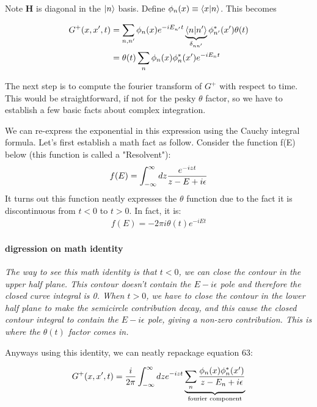 \documentclass[11pt]{article}
\theoremstyle{definition}
\begin{document}
Note $\mathbf{H}$ is diagonal in the $\ket{n}$ basis.  Define $\phi_n(x) \equiv \braket{x | n}$.  This becomes

\begin{align}
G^{+} (x, x', t)& = \sum_{n, n'} \phi_n(x) e^{-i E_{n'} t} \underbrace{\braket{n | n'}}_{\delta_{n n'}} \phi_{n'}^*(x') \theta(t) \\
&=\theta(t) \sum_n \phi_n(x) \phi_n^*(x') e^{- i E_n t} 
\end{align}

The next step is to compute the fourier transform of $G^+$ with respect to time.  This would be straightforward, if not for the pesky $\theta$ factor, so we have to establish a few basic facts about complex integration.

We can re-express the exponential in this expression using the Cauchy integral formula.  Let's first establish a math fact as follow.
Consider the function f(E) below (this function is called a "Resolvent"):
\begin{align}
f(E) = \int_{-\infty}^\infty dz {e^{- i z t} \over z - E + i \epsilon}
\end{align}
It turns out this function neatly expresses the $\theta$ function due to the fact it is discontinuous from $t<0$ to $t>0$.  In fact, it is:
\begin{align}
f(E) = - 2 \pi i \theta(t) e^{- i E t}
\end{align}

\paragraph{digression on math identity}
\emph{
The way to see this math identity is that $ t < 0$, we can close the contour in the upper half plane.  This contour doesn't contain the $E - i\epsilon$ pole and therefore the closed curve integral is 0.  When $t > 0$, we have to close the contour in the lower half plane to make the semicircle contribution decay, and this cause the closed contour integral to contain the $E - i \epsilon$ pole, giving a non-zero contribution.  This is where the $\theta(t)$ factor comes in.}

Anyways using this identity, we can neatly repackage equation 63:

\begin{align}
G^+(x, x', t) = {i \over 2 \pi}\int_{-\infty}^\infty dz e^{-i zt} \underbrace{ \sum_n {\phi_n(x) \phi_n^*(x') \over z - E_n + i \epsilon}}_{\text{fourier component}}
\end{align}
\end{document}
